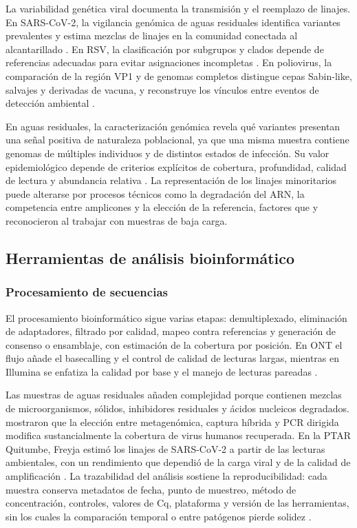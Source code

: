 La variabilidad genética viral documenta la transmisión y el reemplazo de linajes. En SARS-CoV-2, la vigilancia genómica de aguas residuales identifica variantes prevalentes y estima mezclas de linajes en la comunidad conectada al alcantarillado \cite{Crits_Christoph_2021,Karthikeyan_2022}. En RSV, la clasificación por subgrupos y clados depende de referencias adecuadas para evitar asignaciones incompletas \cite{Le_2025}. En poliovirus, la comparación de la región VP1 y de genomas completos distingue cepas Sabin-like, salvajes y derivadas de vacuna, y reconstruye los vínculos entre eventos de detección ambiental \cite{Klapsa_2022,Bottcher_2025}.

En aguas residuales, la caracterización genómica revela qué variantes presentan una señal positiva de naturaleza poblacional, ya que una misma muestra contiene genomas de múltiples individuos y de distintos estados de infección. Su valor epidemiológico depende de criterios explícitos de cobertura, profundidad, calidad de lectura y abundancia relativa \cite{Parkins_2023,Child_2023}. La representación de los linajes minoritarios puede alterarse por procesos técnicos como la degradación del ARN, la competencia entre amplicones y la elección de la referencia, factores que  y  reconocieron al trabajar con muestras de baja carga.

\subsection{Herramientas de análisis bioinformático}

\subsubsection{Procesamiento de secuencias}

El procesamiento bioinformático sigue varias etapas: demultiplexado, eliminación de adaptadores, filtrado por calidad, mapeo contra referencias y generación de consenso o ensamblaje, con estimación de la cobertura por posición. En ONT el flujo añade el basecalling y el control de calidad de lecturas largas, mientras en Illumina se enfatiza la calidad por base y el manejo de lecturas pareadas \cite{Dash_2024}.

Las muestras de aguas residuales añaden complejidad porque contienen mezclas de microorganismos, sólidos, inhibidores residuales y ácidos nucleicos degradados.  mostraron que la elección entre metagenómica, captura híbrida y PCR dirigida modifica sustancialmente la cobertura de virus humanos recuperada. En la PTAR Quitumbe, Freyja estimó los linajes de SARS-CoV-2 a partir de las lecturas ambientales, con un rendimiento que dependió de la carga viral y de la calidad de amplificación \cite{MejiaCalle_2024}. La trazabilidad del análisis sostiene la reproducibilidad: cada muestra conserva metadatos de fecha, punto de muestreo, método de concentración, controles, valores de Cq, plataforma y versión de las herramientas, sin los cuales la comparación temporal o entre patógenos pierde solidez \cite{Parkins_2023}.

